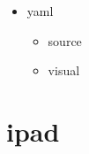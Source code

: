 \documentclass[a4paper]{article}
\begin{document}
\begin{itemize}
\begin{itemize}
\begin{itemize}
\begin{itemize}
               \end{itemize}
               \item visual
            \end{itemize}
            \item yaml
            \begin{itemize}
               \item source
               \item visual
            \end{itemize}

         \end{itemize}
      \end{itemize}
   \section{ipad}

      
      
\end{document}
